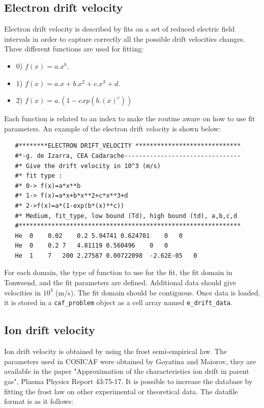 \documentclass[10pt]{article}
\begin{document}
	 \subsection{Electron drift velocity}
  Electron drift velocity is described by fits on a set of reduced electric field intervals in order to capture correctly all the possible drift velocities changes.
  Three different functions are used for fitting:
  \begin{itemize}
  	\item 0) $f(x)=a.x^b$.
  	\item 1) $f(x)=a.x+b.x^2+c.x^3+d$.
  	\item 2) $f(x)=a.(1-exp(b.(x)^c))$
  \end{itemize}
   
   Each function is related to an index to make the routine aware on how to use fit parameters. An example of the electron drift velocity is shown below:
   
   \begin{lstlisting}
   #********ELECTRON DRIFT_VELOCITY *****************************
   #*-g. de Izarra, CEA Cadarache-------------------------------- 
   #* Give the drift velocity in 10^3 (m/s)
   #* fit type :
   #* 0-> f(x)=a*x**b 
   #* 1-> f(x)=a*x+b*x**2+c*x**3+d 
   #* 2->f(x)=a*(1-exp(b*(x)**c)) 
   #* Medium, fit_type, low bound (Td), high bound (td), a,b,c,d
   #*************************************************************
   He  0	0.02	0.2	5.94741	0.624701	0	0
   He  0	0.2	7	4.81119	0.560496	0	0
   He  1	7	200	2.27587	0.00722098	-2.62E-05	0
   \end{lstlisting}
   
	For each domain, the type of function to use for the fit, the fit domain in Tonwsend, and the fit parameters are defined. Additional data should give velocities in $10^{3}$ (m/s). The fit domain should be contiguous. 
   Once data is loaded, it is stored in a \lstinline{caf_problem} object as a cell array named \lstinline{e_drift_data}.
   
   
   \subsection{Ion drift velocity}
   
   Ion drift velocity is obtained by using the frost semi-empirical law. The parameters used in COSICAF were obtained by Goyatina and Maiorov, they are available in the paper "Approximation of the characteristics ion drift in parent gas", Plasma Physics Report 43:75-17. It is possible to increase the database by fitting the frost law on other experimental or theoretical data. The datafile format is as it follows:
   
\end{document}
